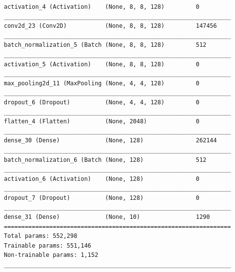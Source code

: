 \documentclass[10pt,english, openany]{book}
\begin{document}
\begin{verbatim}
activation_4 (Activation)    (None, 8, 8, 128)         0         
_________________________________________________________________
conv2d_23 (Conv2D)           (None, 8, 8, 128)         147456    
_________________________________________________________________
batch_normalization_5 (Batch (None, 8, 8, 128)         512       
_________________________________________________________________
activation_5 (Activation)    (None, 8, 8, 128)         0         
_________________________________________________________________
max_pooling2d_11 (MaxPooling (None, 4, 4, 128)         0         
_________________________________________________________________
dropout_6 (Dropout)          (None, 4, 4, 128)         0         
_________________________________________________________________
flatten_4 (Flatten)          (None, 2048)              0         
_________________________________________________________________
dense_30 (Dense)             (None, 128)               262144    
_________________________________________________________________
batch_normalization_6 (Batch (None, 128)               512       
_________________________________________________________________
activation_6 (Activation)    (None, 128)               0         
_________________________________________________________________
dropout_7 (Dropout)          (None, 128)               0         
_________________________________________________________________
dense_31 (Dense)             (None, 10)                1290      
=================================================================
Total params: 552,298
Trainable params: 551,146
Non-trainable params: 1,152
_________________________________________________________________
\end{verbatim}
\end{document}
